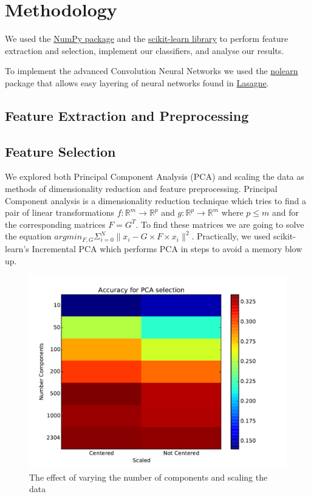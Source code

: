 \documentclass[conference]{IEEEtran}
\begin{document}
\section{Methodology}

We used the \href{http://www.numpy.org/}{NumPy package} and the \href{http://www.scikit-learn.org/}{scikit-learn library} to perform feature extraction and selection, implement our classifiers, and analyse our results. 

To implement the advanced Convolution Neural Networks we used the \href{http://pythonhosted.org/nolearn/}{nolearn} package that allows easy layering of neural networks found in \href{http://lasagne.readthedocs.org/}{Lasagne}.

\subsection{Feature Extraction and Preprocessing}


\subsection{Feature Selection}

We explored both Principal Component Analysis (PCA) and scaling the data as methods of dimensionality reduction and feature preprocessing. Principal Component analysis is a dimensionality reduction technique which tries to find a pair of linear transformations $f:\mathbb{R}^m\rightarrow\mathbb{R}^p$ and $g:\mathbb{R}^p\rightarrow\mathbb{R}^m$ where $p\leq m$ and for the corresponding matrices $F=G^T$. To find these matrices we are going to solve the equation $argmin_{F,G}\Sigma_{i=0}^N\|x_i-G\times F\times x_i\|^2$. Practically, we used scikit-learn's Incremental PCA which performs PCA in steps to avoid a memory blow up. 

\begin{figure}[h]
	\centering
	\includegraphics[scale=0.40]{PCA_gridsearch.pdf}
	\caption{The effect of varying the number of components and scaling the data}
	\label{gridsearchpca}
\end{figure}
\end{document}
